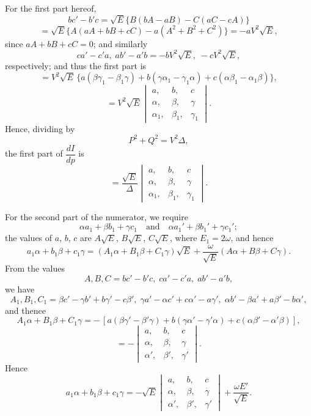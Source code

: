 \documentclass[11pt]{article}
\begin{document}
For the first part hereof,
\[
bc'-b'c = \sqrt{E}\{B(bA-aB) - C(aC-cA)\}
\]
\[
= \sqrt{E}\{A(aA+bB+cC) - a(A^2+B^2+C^2)\} = -a V^2 \sqrt{E},
\]
since $aA+bB+cC=0$; and similarly
\[
ca'-c'a,\; ab'-a'b = -b V^2 \sqrt{E},\; -c V^2 \sqrt{E},
\]
respectively; and thus the first part is
\[
= V^2 \sqrt{E}\,\{a(\beta\gamma_1-\beta_1\gamma) + b(\gamma\alpha_1-\gamma_1\alpha) + c(\alpha\beta_1-\alpha_1\beta)\},
\]
\[
= V^2 \sqrt{E}
\begin{vmatrix} a, & b, & c \\ \alpha, & \beta, & \gamma \\ \alpha_1, & \beta_1, & \gamma_1 \end{vmatrix}.
\]
Hence, dividing by
\[
P^2+Q^2 = V^2\Delta,
\]
the first part of $\dfrac{dI}{dp}$ is
\[
= \frac{\sqrt{E}}{\Delta}
\begin{vmatrix} a, & b, & c \\ \alpha, & \beta, & \gamma \\ \alpha_1, & \beta_1, & \gamma_1 \end{vmatrix}.
\]

For the second part of the numerator, we require
\[
\alpha a_1 + \beta b_1 + \gamma c_1\quad \text{and}\quad \alpha a_1' + \beta b_1' + \gamma c_1';
\]
the values of $a$, $b$, $c$ are $A\sqrt{E}$, $B\sqrt{E}$, $C\sqrt{E}$, where $E_1=2\omega$, and hence
\[
a_1\alpha + b_1\beta + c_1\gamma = (A_1\alpha+B_1\beta+C_1\gamma)\sqrt{E} + \frac{\omega}{\sqrt{E}}(A\alpha+B\beta+C\gamma).
\]
From the values
\[
A, B, C = bc'-b'c,\; ca'-c'a,\; ab'-a'b,
\]
we have
\[
A_1, B_1, C_1 = \beta c'-\gamma b' + b\gamma'-c\beta',\; \gamma a'-\alpha c' + c\alpha'-a\gamma',\; \alpha b'-\beta a' + a\beta'-b\alpha',
\]
and thence
\[
A_1\alpha + B_1\beta + C_1\gamma = -\,[a(\beta\gamma'-\beta'\gamma) + b(\gamma\alpha'-\gamma'\alpha) + c(\alpha\beta'-\alpha'\beta)],
\]
\[
= -\begin{vmatrix} a, & b, & c \\ \alpha, & \beta, & \gamma \\ \alpha', & \beta', & \gamma' \end{vmatrix}.
\]
Hence
\[
a_1\alpha + b_1\beta + c_1\gamma = -\sqrt{E}
\begin{vmatrix} a, & b, & c \\ \alpha, & \beta, & \gamma \\ \alpha', & \beta', & \gamma' \end{vmatrix} + \frac{\omega E'}{\sqrt{E}}.
\]
\end{document}
